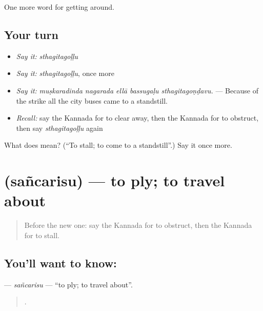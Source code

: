\begin{grammarlens}[title={What you've built}]
One more word for getting around.
\end{grammarlens}

\subsection*{Your turn}
\begin{itemize}
\raggedright
  \item \emph{Say it:} \emph{sthagitagoḷḷu}
  \item \emph{Say it:} \emph{sthagitagoḷḷu}, once more
  \item \emph{Say it:} \emph{muṣkaradinda nagarada ellā bassugaḷu sthagitagoṇḍavu.} — Because of the strike all the city buses came to a standstill.
  \item \emph{Recall:} say the Kannada for to clear away, then the Kannada for to obstruct, then say \emph{sthagitagoḷḷu} again
\end{itemize}

\begin{tcolorbox}[breakable,colback=teal!4,colframe=teal!35!black,title={Before you move on}]
What does  mean? (\textquotedblleft{}To stall; to come to a standstill\textquotedblright{}.) Say it once more.
\end{tcolorbox}
\section[\texorpdfstring{\kn{ಸಂಚರಿಸು} (sañcarisu)}{ಸಂಚರಿಸು (sañcarisu)}]{ (sañcarisu) — to ply; to travel about}

\label{lesson:KA-C447-sancarisu}



\begin{quote}
Before the new one: say the Kannada for to obstruct, then the Kannada for to stall.
\end{quote}

\subsection*{You'll want to know: }
\textbf{} — \emph{sañcarisu} — \textquotedblleft{}to ply; to travel about\textquotedblright{}.

\begin{quote}
      .
\end{quote}

